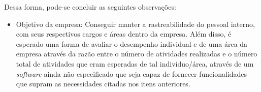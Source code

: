Dessa forma, pode-se concluir as seguintes observações:

\begin{itemize}
\item Objetivo da empresa: Conseguir manter a rastreabilidade do pessoal interno, com seus respectivos cargos e áreas dentro da empresa. Além disso, é esperado uma forma de avaliar o desempenho individual e de uma área da empresa através da razão entre o número de atividades realizadas e o número total de atividades que eram esperadas de tal indivíduo/área, através de um \textit{software} ainda não especificado que seja capaz de fornecer funcionalidades que supram as necessidades citadas nos itens anteriores.
\end{itemize}
